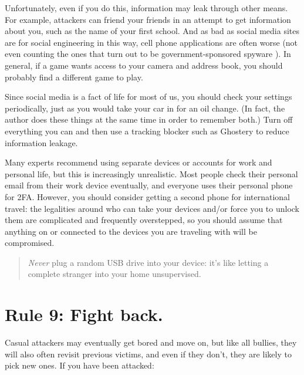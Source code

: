 \documentclass[10pt, letterpaper]{article}
\begin{document}
Unfortunately, even if you do this, information may leak through other
means. For example, attackers can friend your friends in an attempt to get
information about you, such as the name of your first school. And as bad as
social media sites are for social engineering in this way, cell phone
applications are often worse (not even counting the ones that turn out to be
government-sponsored spyware \cite{Schn2019}). In general, if a game wants
access to your camera and address book, you should probably find a different
game to play.

Since social media is a fact of life for most of us, you should check your
settings periodically, just as you would take your car in for an oil change. (In
fact, the author does these things at the same time in order to remember both.)
Turn off everything you can and then use a tracking blocker such as Ghostery to
reduce information leakage.

Many experts recommend using separate devices or accounts for work and personal
life, but this is increasingly unrealistic. Most people check their personal email
from their work device eventually, and everyone uses their personal phone for
2FA. However, you should consider getting a second phone for international
travel: the legalities around who can take your devices and/or force you to
unlock them are complicated and frequently overstepped, so you should assume
that anything on or connected to the devices you are traveling with will be
compromised.

\begin{quote}
  \emph{Never} plug a random USB drive into your device: it's like letting a
  complete stranger into your home unsupervised.
\end{quote}

\section*{Rule 9: Fight back.}

Casual attackers may eventually get bored and move on, but like all bullies,
they will also often revisit previous victims, and even if they don't, they are
likely to pick new ones. If you have been attacked:
\end{document}
